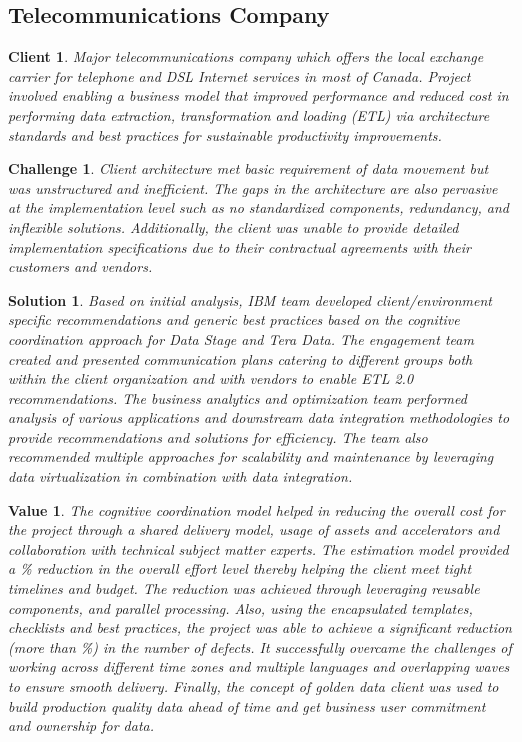 \documentclass[10pt,journal,cspaper,compsoc]{IEEEtran}
\newtheorem{client}{Client}
\newtheorem{challenge}{Challenge}
\newtheorem{solution}{Solution}
\newtheorem{val}{Value}
\begin{document}
\subsection{Telecommunications Company}

\begin{client}
Major telecommunications company which offers the local exchange carrier for telephone and 
DSL Internet services in most of Canada.  Project involved enabling a business model that improved performance and reduced cost in
performing data extraction, transformation and loading (ETL) via architecture standards and best practices for sustainable productivity improvements. 
\end{client}
\begin{challenge}
Client architecture met basic requirement of data movement but was unstructured and inefficient. The gaps in the architecture are 
also pervasive at the implementation level such as no standardized components, redundancy, and inflexible solutions.  Additionally, 
the client was unable to provide detailed implementation specifications due to their contractual agreements with their customers 
and vendors.
\end{challenge}
\begin{solution}
Based on initial analysis, IBM team developed client/environment specific recommendations and generic best practices based on the cognitive coordination 
approach for Data Stage and Tera Data. The engagement team created and presented communication plans catering to different groups 
both within the client organization and with vendors to enable ETL 2.0 recommendations. The business analytics and optimization
team performed analysis of various applications and downstream data integration methodologies to provide recommendations and 
solutions for efficiency. The team also recommended multiple approaches for scalability and maintenance by leveraging data virtualization 
in combination with data integration.
\end{solution}
\begin{val}
The cognitive coordination model helped in reducing the overall cost for the project through a shared delivery model, usage of assets and accelerators 
and collaboration with technical subject matter experts. The estimation model provided a \% reduction in the overall 
effort level thereby helping the client meet tight timelines and budget. The reduction was achieved through leveraging reusable 
components, and parallel processing. Also, using the encapsulated templates, checklists and best practices, the project was able 
to achieve a significant reduction (more than \%) in the number of defects. It successfully overcame the challenges of working 
across different time zones and multiple languages and overlapping waves to ensure smooth delivery. Finally, the concept of 
\emph{golden data client} was used to build production quality data ahead of time and get business user commitment and ownership for data.
\end{val}
\end{document}
